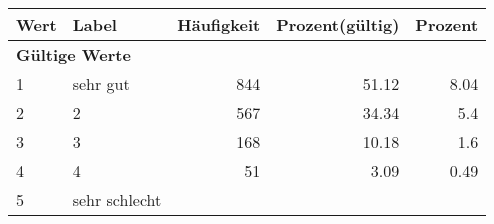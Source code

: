      \begin{longtable}{lXrrr}
     \toprule
     \textbf{Wert} & \textbf{Label} & \textbf{Häufigkeit} & \textbf{Prozent(gültig)} & \textbf{Prozent} \\
     \endhead
     \midrule
     \multicolumn{5}{l}{\textbf{Gültige Werte}}\\

     1 &
     \multicolumn{1}{X}{ sehr gut   } &


       \num{844} &
       \num[round-mode=places,round-precision=2]{51.12} &
         \num[round-mode=places,round-precision=2]{8.04} \\

     2 &
     \multicolumn{1}{X}{ 2   } &


       \num{567} &
       \num[round-mode=places,round-precision=2]{34.34} &
         \num[round-mode=places,round-precision=2]{5.4} \\

     3 &
     \multicolumn{1}{X}{ 3   } &


       \num{168} &
       \num[round-mode=places,round-precision=2]{10.18} &
         \num[round-mode=places,round-precision=2]{1.6} \\

     4 &
     \multicolumn{1}{X}{ 4   } &


       \num{51} &
       \num[round-mode=places,round-precision=2]{3.09} &
         \num[round-mode=places,round-precision=2]{0.49} \\

     5 &
     \multicolumn{1}{X}{ sehr schlecht   } &



\end{longtable}

